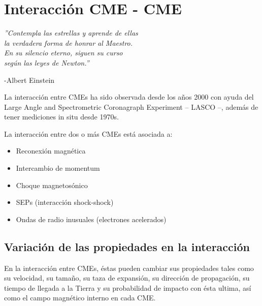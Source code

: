 \chapter{Interacción CME - CME}
\begin{flushright}
\item \textit{''Contempla las estrellas y aprende de ellas
\\
la verdadera forma de honrar al Maestro.
\\
En su silencio eterno, siguen su curso
\\
según las leyes de Newton.''}

-Albert Einstein
\end{flushright}

La interacción entre \acp{CME} ha sido observada desde los años 2000 con ayuda del Large Angle and Spectrometric Coronagraph Experiment – LASCO –, además de tener mediciones in situ desde 1970s.



La interacción entre dos o más \acp{CME} está asociada a:

\begin{itemize}
    \item Reconexión magnética
\item Intercambio de momentum
\item Choque magnetosónico
\item SEPs (interacción shock-shock)
\item Ondas de radio inusuales (electrones acelerados)
\end{itemize}

\section{Variación de las propiedades en la interacción}
En la interacción entre CMEs, éstas pueden cambiar sus propiedades tales como su velocidad, su tamaño, su taza de expansión, su dirección de propagación, su tiempo de llegada a la Tierra y su probabilidad de impacto con ésta ultima, así como el campo magnético interno en cada CME.

